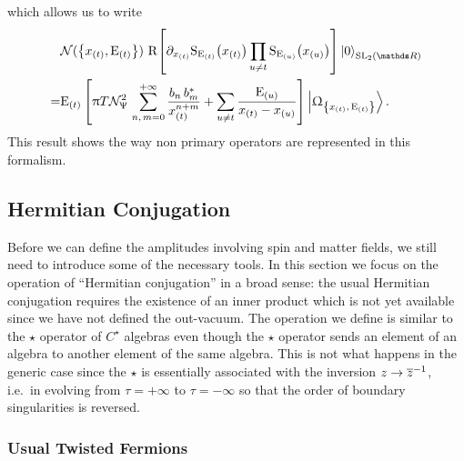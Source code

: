 which allows us to write
\begin{equation}
  \begin{split}
    &
    \cN(\qty{x_{(t)}, \rE_{(t)} })~
    \rR\qty[%
      \ipd{x_{(t)}} \rS_{\rE_{(t)}}\qty( x_{(t)} )
      \prod_{u \ne t} \rS_{\rE_{(u)}}\qty( x_{(u)} )
    ]
    \regvacuum
    \\
    = &
    \rE_{(t)}\,
    \qty[%
      \pi T \cN_{\Psi}^2\,
      \zeroinfsum{n,\, m}
      \frac{b_n\, b^*_m}{x_{(t)}^{n + m}}
      +
      \sum_{u \ne t}
      \frac{\rE_{(u)}}{x_{(t)} - x_{(u)}}
    ]
    \GGexcvacket.
  \end{split}
\end{equation}        
This result shows the way non primary operators are represented in this formalism.


\subsection{Hermitian Conjugation}
\label{sec:hermitian_and_outvacuum}

Before we can define the amplitudes involving spin and matter fields, we still need to introduce some of the necessary tools.
In this section we focus on the operation of ``Hermitian conjugation'' in a broad sense: the usual Hermitian conjugation requires the existence of an inner product which is not yet available since we have not defined the out-vacuum.
The operation we define is similar to the  $\star$ operator of $C^\star$ algebras even though the $\star$ operator sends an element of an algebra to another element of the same algebra.
This is not what happens in the generic case since the $\star$ is essentially associated with the inversion $z \rightarrow \overline{z}^{-1}$, i.e.\ in evolving from $\tau = +\infty$ to $\tau = -\infty$ so that the order of boundary singularities is reversed.
  

\subsubsection{Usual Twisted Fermions}

